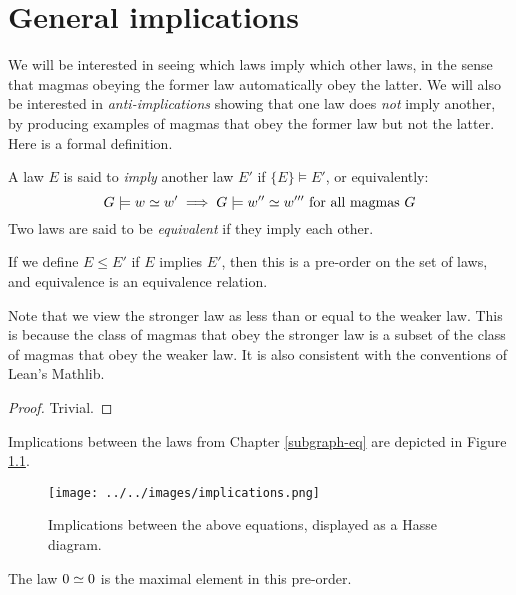 \chapter{General implications}

We will be interested in seeing which laws imply which other laws, in the sense that magmas obeying the former law automatically obey the latter.  We will also be interested in \emph{anti-implications} showing that one law does \emph{not} imply another, by producing examples of magmas that obey the former law but not the latter. Here is a formal definition.

\begin{definition}[Implication]\label{impl}  A law $E$ is said to \emph{imply} another law $E'$ if $\{E\} \models E'$, or equivalently:
  $$ G \models w  \simeq  w' \implies G \models w''  \simeq  w''' \hbox{ for all magmas } G$$
Two laws are said to be \emph{equivalent} if they imply each other.
\end{definition}

\begin{lemma}\leanok\label{pre-order}  If we define $E \leq E'$ if $E$ implies $E'$, then this is a pre-order on the set of laws, and equivalence is an equivalence relation.
\end{lemma}

Note that we view the stronger law as less than or equal to the weaker law.  This is because the class of magmas that obey the stronger law is a subset of the class of magmas that obey the weaker law.  It is also consistent with the conventions of Lean's Mathlib.

\begin{proof}\leanok Trivial.
\end{proof}

Implications between the laws from Chapter \ref{subgraph-eq} are depicted in Figure \ref{fig:implications}.

\begin{figure}
  \centering
  \texttt{[image: ../../images/implications.png]}
  \caption{Implications between the above equations, displayed as a Hasse diagram.}
  \label{fig:implications}
\end{figure}


\begin{lemma}\label{maximal}  The law $0  \simeq  0$ is the maximal element in this pre-order.
\end{lemma}

